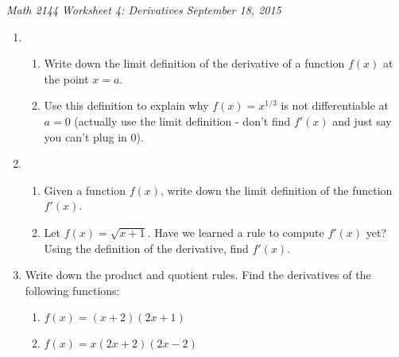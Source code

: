\documentclass[11pt]{article}
\begin{document}
\begin{center}
\textit{Math 2144} \hspace{5 pt} \textit{Worksheet 4: Derivatives} \hspace{5 pt} \textit{September 18, 2015}
\end{center}

\begin{enumerate}
\item 
\begin{enumerate}
	\item Write down the limit definition of the derivative of a function $f(x)$ at the point $x=a$.
	
	\vspace{15 pt}
	
	\item Use this definition to explain why $f(x)=x^{1/3}$ is not differentiable at $a=0$ (actually use the limit definition - don't find $f'(x)$ and just say you can't plug in $0$).

\vspace{20 pt}

\end{enumerate}


\item
\begin{enumerate}
	\item Given a function $f(x)$, write down the limit definition of the function $f'(x)$.
	
	\vspace{15 pt}
	
	\item Let $f(x)=\sqrt{x+1}$.  Have we learned a rule to compute $f'(x)$ yet?  Using the definition of the derivative, find $f'(x)$.	
	
	\vspace{20 pt}
	
\end{enumerate}

\item  Write down the product and quotient rules.  Find the derivatives of the following functions:
\begin{enumerate}
\item $f(x)=(x+2)(2x+1)$

\vspace{10 pt}

\item $f(x)=x(2x+2)(2x-2)$

\vspace{10 pt}


\end{enumerate}
\end{enumerate}
\end{document}
